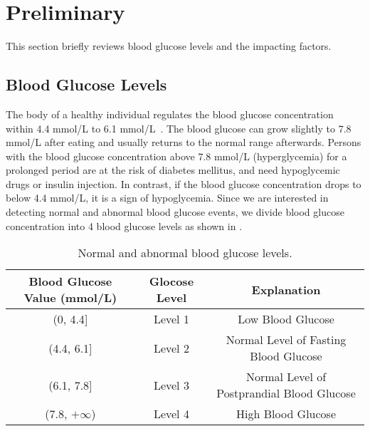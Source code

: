 
\section{Preliminary}
\label{sec:preliminary}
This section briefly reviews blood glucose levels and the impacting factors.

\subsection{Blood Glucose Levels}
The body of a healthy individual regulates the blood glucose concentration within 4.4 mmol/L to 6.1 mmol/L~\cite{bib:BGWiKi}.
The blood glucose can grow slightly to 7.8 mmol/L after eating and usually returns to the normal range afterwards.
Persons with the blood glucose concentration above 7.8 mmol/L (hyperglycemia) for a prolonged period are at the risk of diabetes mellitus, and need hypoglycemic drugs or insulin injection.
In contrast, if the blood glucose concentration drops to below 4.4 mmol/L, it is a sign of hypoglycemia.
Since we are interested in detecting normal and abnormal blood glucose events, we divide blood glucose concentration into 4 blood glucose levels as shown in .

\begin{table}[h]
  \centering
  \caption{Normal and abnormal blood glucose levels.}
  \label{tab:blood_glucose_levels}
  \begin{tabular}{|c|c|c|}
  \hline
  \textbf{Blood Glucose Value (mmol/L)} & \textbf{Glocose Level} & \textbf{Explanation}                      \\ \hline
  (0, 4.4{]}                            & Level 1                & Low Blood Glucose                          \\ \hline
  (4.4, 6.1{]}                          & Level 2                & Normal Level of Fasting Blood Glucose      \\ \hline
  (6.1, 7.8{]}                          & Level 3                & Normal Level of Postprandial Blood Glucose \\ \hline
  (7.8, $+\infty$)                               & Level 4                & High Blood Glucose                         \\ \hline
  \end{tabular}
\end{table}

